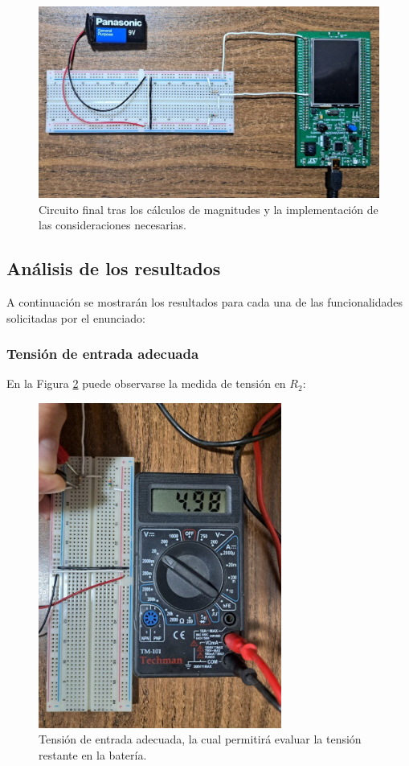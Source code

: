 \begin{figure}[H]
\centering
\includegraphics[width=125mm]{./Figuras/Desarrollo_Analisis/SYS}
\caption{Circuito final tras los cálculos de magnitudes y la implementación de las consideraciones necesarias.} 
\label{fig:final}
\end{figure}

\subsection{Análisis de los resultados}
 A continuación se mostrarán los resultados para cada una de las funcionalidades solicitadas por el enunciado: 

\subsubsection{Tensión de entrada adecuada}
En la Figura \ref{fig:5V} puede observarse la medida de tensión en $R_{2}$:

\begin{figure}[H]
\centering
\includegraphics[width=80mm]{./Figuras/Desarrollo_Analisis/5V}
\caption{Tensión de entrada adecuada, la cual permitirá evaluar la tensión restante en la batería.} 
\label{fig:5V}
\end{figure}

